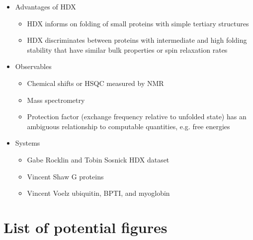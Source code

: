 \documentclass[9pt,review]{livecoms}
\begin{document}
\begin{itemize}

\item Advantages of HDX

	\begin{itemize}
	\item HDX informs on folding of small proteins with simple tertiary structures
	\item HDX discriminates between proteins with intermediate and high folding stability that have similar bulk properties or spin relaxation rates
	\end{itemize}

\item Observables

	\begin{itemize}
	\item Chemical shifts or HSQC measured by NMR
	\item Mass spectrometry
	\item Protection factor (exchange frequency relative to unfolded state) has an ambiguous relationship to computable quantities, e.g. free energies
	\end{itemize}

\item Systems

	\begin{itemize}
	\item Gabe Rocklin and Tobin Sosnick HDX dataset
	\item Vincent Shaw G proteins
	\item Vincent Voelz ubiquitin, BPTI, and myoglobin
	\end{itemize}

\end{itemize}

\section{List of potential figures}
\end{document}
